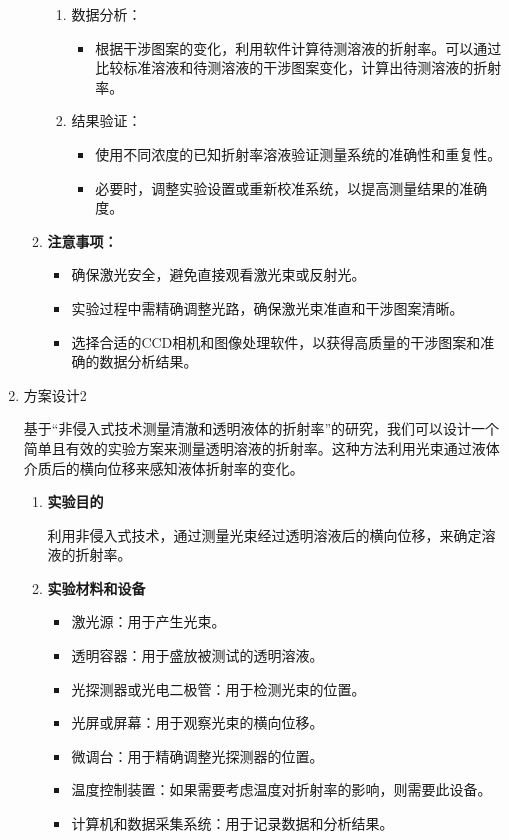 \documentclass[dvipsnames, svgnames,a4paper,11pt]{article}
\begin{document}
\begin{enumerate}
\begin{enumerate}
\begin{enumerate}
				\item 数据分析：
				\begin{itemize}
					\item 根据干涉图案的变化，利用软件计算待测溶液的折射率。可以通过比较标准溶液和待测溶液的干涉图案变化，计算出待测溶液的折射率。
				\end{itemize}
				
				\item 结果验证：
				\begin{itemize}
					\item 使用不同浓度的已知折射率溶液验证测量系统的准确性和重复性。
					\item 必要时，调整实验设置或重新校准系统，以提高测量结果的准确度。
				\end{itemize}
			\end{enumerate}
			
			\item \textbf{注意事项：}
			
			\begin{itemize}
				\item 确保激光安全，避免直接观看激光束或反射光。
				\item 实验过程中需精确调整光路，确保激光束准直和干涉图案清晰。
				\item 选择合适的CCD相机和图像处理软件，以获得高质量的干涉图案和准确的数据分析结果。
			\end{itemize}
		\end{enumerate}
		
		\item 方案设计2
		
		基于“非侵入式技术测量清澈和透明液体的折射率”的研究，我们可以设计一个简单且有效的实验方案来测量透明溶液的折射率。这种方法利用光束通过液体介质后的横向位移来感知液体折射率的变化。
		
		\begin{enumerate}
			\item \textbf{实验目的}
			
			利用非侵入式技术，通过测量光束经过透明溶液后的横向位移，来确定溶液的折射率。
			
			\item \textbf{实验材料和设备}
			
			\begin{itemize}
				\item 激光源：用于产生光束。
				\item 透明容器：用于盛放被测试的透明溶液。
				\item 光探测器或光电二极管：用于检测光束的位置。
				\item 光屏或屏幕：用于观察光束的横向位移。
				\item 微调台：用于精确调整光探测器的位置。
				\item 温度控制装置：如果需要考虑温度对折射率的影响，则需要此设备。
				\item 计算机和数据采集系统：用于记录数据和分析结果。
			\end{itemize}
			

\end{enumerate}
\end{enumerate}
\end{document}
